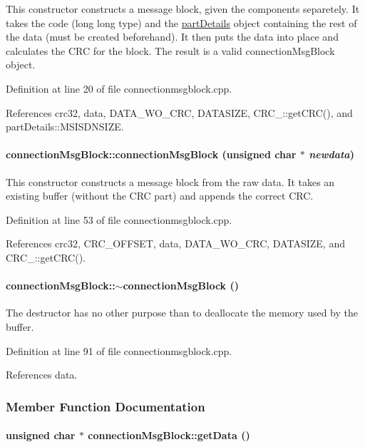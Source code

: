 This constructor constructs a message block, given the components separetely. It takes the code (long long type) and the \hyperlink{classpartDetails}{part\-Details} object containing the rest of the data (must be created beforehand). It then puts the data into place and calculates the CRC for the block. The result is a valid connection\-Msg\-Block object. 

Definition at line 20 of file connectionmsgblock.cpp.

References crc32, data, DATA\_\-WO\_\-CRC, DATASIZE, CRC\_::get\-CRC(), and part\-Details::MSISDNSIZE.\hypertarget{classconnectionMsgBlock_connectionMsgBlocka1}{
\paragraph[connectionMsgBlock]{\setlength{\rightskip}{0pt plus 5cm}connection\-Msg\-Block::connection\-Msg\-Block (unsigned char $\ast$ {\em newdata})}\hfill}
\label{classconnectionMsgBlock_connectionMsgBlocka1}


This constructor constructs a message block from the raw data. It takes an existing buffer (without the CRC part) and appends the correct CRC. 

Definition at line 53 of file connectionmsgblock.cpp.

References crc32, CRC\_\-OFFSET, data, DATA\_\-WO\_\-CRC, DATASIZE, and CRC\_::get\-CRC().\hypertarget{classconnectionMsgBlock_connectionMsgBlocka2}{
\paragraph[$\sim$connectionMsgBlock]{\setlength{\rightskip}{0pt plus 5cm}connection\-Msg\-Block::$\sim$connection\-Msg\-Block ()}\hfill}
\label{classconnectionMsgBlock_connectionMsgBlocka2}


The destructor has no other purpose than to deallocate the memory used by the buffer. 

Definition at line 91 of file connectionmsgblock.cpp.

References data.

\subsubsection{Member Function Documentation}
\hypertarget{classconnectionMsgBlock_connectionMsgBlocka6}{
\paragraph[getData]{\setlength{\rightskip}{0pt plus 5cm}unsigned char $\ast$ connection\-Msg\-Block::get\-Data ()}\hfill}
\label{classconnectionMsgBlock_connectionMsgBlocka6}


